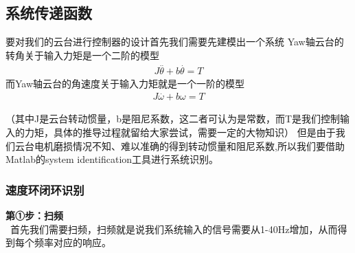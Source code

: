 \documentclass[UTF8,a4paper,12pt]{ctexart}
\begin{document}
  \subsection{系统传递函数}
    要对我们的云台进行控制器的设计首先我们需要先建模出一个系统
    Yaw轴云台的转角关于输入力矩是一个二阶的模型
    \begin{align*}
       J\overset{..}{\theta}+b\overset{.}{\theta}=T
    \end{align*}
    而Yaw轴云台的角速度关于输入力矩就是一个一阶的模型
    \begin{align*}
      J\overset{.}{\omega}+b\omega =T
    \end{align*}
    \begin{flushleft}
      （其中J是云台转动惯量，b是阻尼系数，这二者可认为是常数，而T是我们控制输入的力矩，具体的推导过程就留给大家尝试，需要一定的大物知识）
    但是由于我们云台电机磨损情况不知、难以准确的得到转动惯量和阻尼系数,所以我们要借助Matlab的system identification工具进行系统识别。\\
   \subsubsection{速度环闭环识别}
      \begin{flushleft}
        \textbf{第①步：扫频}\\
        \ 首先我们需要扫频，扫频就是说我们系统输入的信号需要从1-40Hz增加，从而得到每个频率对应的响应。
      \end{flushleft}


\end{flushleft}
\end{document}
